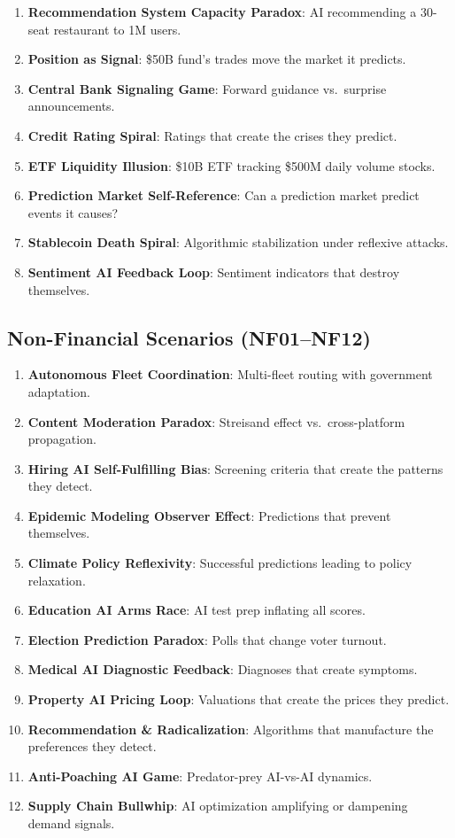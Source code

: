 \documentclass{article}
\begin{document}
\begin{enumerate}[label=\textbf{F\arabic*},leftmargin=*]
\item \textbf{Recommendation System Capacity Paradox}: AI recommending a 30-seat restaurant to 1M users.
\item \textbf{Position as Signal}: \$50B fund's trades move the market it predicts.
\item \textbf{Central Bank Signaling Game}: Forward guidance vs.\ surprise announcements.
\item \textbf{Credit Rating Spiral}: Ratings that create the crises they predict.
\item \textbf{ETF Liquidity Illusion}: \$10B ETF tracking \$500M daily volume stocks.
\item \textbf{Prediction Market Self-Reference}: Can a prediction market predict events it causes?
\item \textbf{Stablecoin Death Spiral}: Algorithmic stabilization under reflexive attacks.
\item \textbf{Sentiment AI Feedback Loop}: Sentiment indicators that destroy themselves.
\end{enumerate}

\subsection{Non-Financial Scenarios (NF01--NF12)}

\begin{enumerate}[label=\textbf{NF\arabic*},leftmargin=*,start=1]
\item \textbf{Autonomous Fleet Coordination}: Multi-fleet routing with government adaptation.
\item \textbf{Content Moderation Paradox}: Streisand effect vs.\ cross-platform propagation.
\item \textbf{Hiring AI Self-Fulfilling Bias}: Screening criteria that create the patterns they detect.
\item \textbf{Epidemic Modeling Observer Effect}: Predictions that prevent themselves.
\item \textbf{Climate Policy Reflexivity}: Successful predictions leading to policy relaxation.
\item \textbf{Education AI Arms Race}: AI test prep inflating all scores.
\item \textbf{Election Prediction Paradox}: Polls that change voter turnout.
\item \textbf{Medical AI Diagnostic Feedback}: Diagnoses that create symptoms.
\item \textbf{Property AI Pricing Loop}: Valuations that create the prices they predict.
\item \textbf{Recommendation \& Radicalization}: Algorithms that manufacture the preferences they detect.
\item \textbf{Anti-Poaching AI Game}: Predator-prey AI-vs-AI dynamics.
\item \textbf{Supply Chain Bullwhip}: AI optimization amplifying or dampening demand signals.
\end{enumerate}
\end{document}
